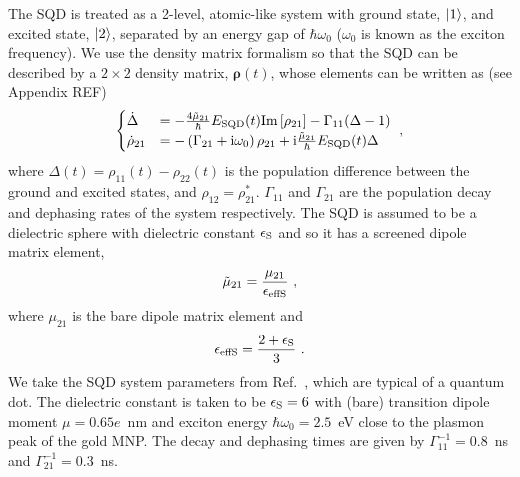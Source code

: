 The SQD is treated as a 2-level, atomic-like system with ground state,
$\left|1\right\rangle$, and excited state, $\left|2\right\rangle$, separated by an energy gap of
$\hbar\omega_0$ ($\omega_0$ is known as the exciton frequency). We use the
density matrix formalism so that the SQD can be described by a $2\times
2$ density matrix, $\bm\rho(t)$, whose elements can be written as (see Appendix
REF)
%
\begin{equation}
    \begin{cases}
        \dot{\Delta} &= -\frac{4\mut}{\hbar}\esqd(t)\imag{\rho_{21}} -
        \Gamma_{11}(\Delta - 1)   \\
        \dot\rho_{21} &= -\left( \Gamma_{21}+\imagn\omega_0
        \right)\rho_{21} + \imagn\frac{\mut}{\hbar}\esqd(t) \Delta
        \label{eq:eoms}
    \end{cases} \ ,
\end{equation}
%
where $\Delta(t)=\rho_{11}(t)-\rho_{22}(t)$ is the population difference between the
ground and excited states, and $\rho_{12}=\rho_{21}^*$. $\Gamma_{11}$ and $\Gamma_{21}$ are the population
decay and dephasing rates of the system respectively. The SQD is assumed to be
a
dielectric sphere with dielectric constant $\epsilon_{\text{S}}$ and so it has a screened
dipole matrix element,
%
\begin{equation}
    \tilde{\mu}_{21}=\frac{\mu_{21}}{\epsilon_{\text{effS}}} \ ,
\end{equation}
%
where $\mu_{21}$ is the bare
dipole matrix element and~\cite{batygin_problems_1978}
%
\begin{equation}
    \epsilon_{\text{effS}}=\frac{2+\epsilon_{\text{S}}}{3} \ .
\end{equation}
%
 We take the SQD system parameters from
Ref.~\cite{zhang_semiconductor-metal_2006}, which are typical of a 
quantum dot.
The dielectric
constant is taken to be $\epsilon_{\text{S}}=6$ with (bare) transition dipole moment $\mu=0.65e$~nm and
exciton energy $\hbar\omega_0=2.5$~eV close to the plasmon peak of the gold MNP.
The decay and dephasing times are given by
$\Gamma_{11}^{-1}=0.8$~ns and $\Gamma_{21}^{-1}=0.3$~ns. 

